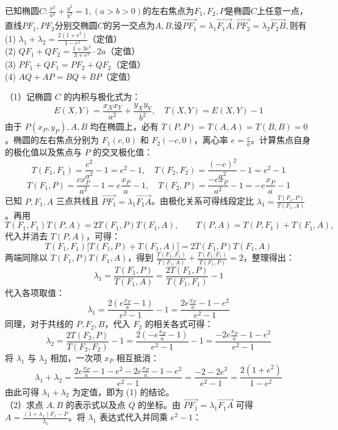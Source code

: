 \begin{exercise}
已知椭圆$C:\frac{x^{2}}{a^{2}}+\frac{y^{2}}{b^{2}}=1,(a>b>0)$的左右焦点为$F_{1},F_{2},P$是椭圆$C$上任意一点，直线$PF_{1},PF_{2}$分别交椭圆$C$的另一交点为$A,B$,设$\overrightarrow{PF_{1}}=\lambda_{1}\overrightarrow{F_{1}A},\overrightarrow{PF_{2}}=\lambda_{2}\overrightarrow{F_{2}B},$则有\\
(1) $\lambda_1 + \lambda_2 = \frac{2(1+e^2)}{1-e^2}$（定值）  \\
(2) $QF_1 + QF_2 = \frac{1+3e^2}{3+e^2} \cdot 2a$（定值）  \\
(3) $PF_1 + QF_1 = PF_2 + QF_2$（定值）  \\
(4) $AQ + AP = BQ + BP$（定值）
\end{exercise}
\begin{solution}
（1）记椭圆 $C$ 的内积与极化式为：
$$E(X,Y) = \frac{x_X x_Y}{a^2} + \frac{y_X y_Y}{b^2}, \quad T(X,Y) = E(X,Y) - 1$$
由于 $P(x_P, y_P), A, B$ 均在椭圆上，必有 $T(P,P) = T(A,A) = T(B,B) = 0$。椭圆的左右焦点分别为 $F_1(c,0)$ 和 $F_2(-c,0)$，离心率 $e = \frac{c}{a}$。计算焦点自身的极化值以及焦点与 $P$ 的交叉极化值：
$$T(F_1,F_1) = \frac{c^2}{a^2} - 1 = e^2 - 1, \quad T(F_2,F_2) = \frac{(-c)^2}{a^2} - 1 = e^2 - 1$$
$$T(F_1,P) = \frac{c x_P}{a^2} - 1 = e\frac{x_P}{a} - 1, \quad T(F_2,P) = \frac{-c x_P}{a^2} - 1 = -e\frac{x_P}{a} - 1$$
已知 $P, F_1, A$ 三点共线且 $\overrightarrow{PF_1} = \lambda_1 \overrightarrow{F_1A}$。由极化关系可得线段定比 $\lambda_1 = \frac{T(F_1,P)}{T(F_1,A)}$。再用
\[
T(F_1,F_1) T(P,A) = 2 T(F_1,P) T(F_1,A),\qquad
T(P,A) = T(P,F_1) + T(F_1,A),
\]
代入并消去 $T(P,A)$，可得：
$$T(F_1,F_1) \big[ T(F_1,P) + T(F_1,A) \big] = 2 T(F_1,P) T(F_1,A)$$
两端同除以 $T(F_1,P) T(F_1,A)$，得到 $\frac{T(F_1,F_1)}{T(F_1,A)} + \frac{T(F_1,F_1)}{T(F_1,P)} = 2$，整理得出：
$$\lambda_1 = \frac{T(F_1,P)}{T(F_1,A)} = \frac{2 T(F_1,P)}{T(F_1,F_1)} - 1$$
代入各项取值：
$$\lambda_1 = \frac{2(e\frac{x_P}{a} - 1)}{e^2 - 1} - 1 = \frac{2e\frac{x_P}{a} - 1 - e^2}{e^2 - 1}$$
同理，对于共线的 $P, F_2, B$，代入 $F_2$ 的相关各式可得：
$$\lambda_2 = \frac{2 T(F_2,P)}{T(F_2,F_2)} - 1 = \frac{2(-e\frac{x_P}{a} - 1)}{e^2 - 1} - 1 = \frac{-2e\frac{x_P}{a} - 1 - e^2}{e^2 - 1}$$
将 $\lambda_1$ 与 $\lambda_2$ 相加，一次项 $x_P$ 相互抵消：
$$\lambda_1 + \lambda_2 = \frac{2e\frac{x_P}{a} - 1 - e^2 - 2e\frac{x_P}{a} - 1 - e^2}{e^2 - 1} = \frac{-2 - 2e^2}{e^2 - 1} = \frac{2(1+e^2)}{1-e^2}$$
由此可得 $\lambda_1 + \lambda_2$ 为定值，即为 (1) 的结论。\\
（2）求点 $A, B$ 的表示式以及点 $Q$ 的坐标。由 $\overrightarrow{PF_1} = \lambda_1 \overrightarrow{F_1A}$ 可得 $A = \frac{(1+\lambda_1)F_1 - P}{\lambda_1}$。将 $\lambda_1$ 表达式代入并同乘 $e^2-1$：

\end{solution}
